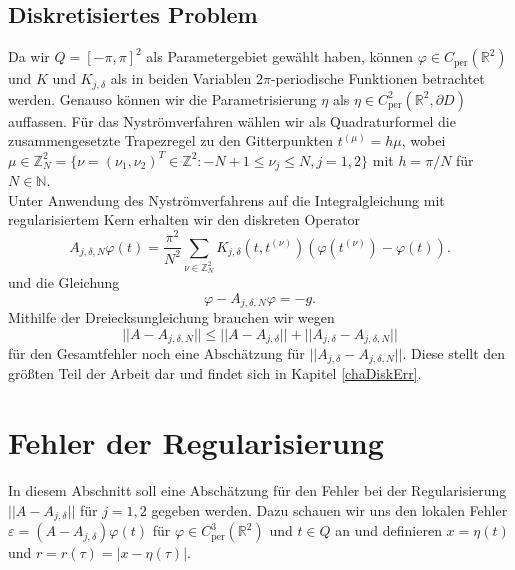 \documentclass[12pt,a4paper]{scrartcl}
\numberwithin{equation}{section}
\newcommand{\R}{\mathbb{R}} %
\newcommand{\Z}{\mathbb{Z}} %
\newcommand{\N}{\mathbb{N}} %
\newcommand{\per}{\operatorname{per}}
\begin{document}
\subsection{Diskretisiertes Problem} \label{DiskProblem}

Da wir $Q=[-\pi,\pi]^2$ als Parametergebiet gewählt haben, können $\varphi\in C_{\mathrm{per}}(\R^2)$ und $K$ und $K_{j,\delta}$ als in beiden Variablen $2 \pi$-periodische Funktionen betrachtet werden. Genauso können wir die Parametrisierung $\eta$ als $\eta \in C_{\per}^2(\R^2,\partial D)$ auffassen. Für das Nyströmverfahren wählen wir als Quadraturformel die zusammengesetzte Trapezregel zu den Gitterpunkten $t^{(\mu)}=h \mu$, wobei $\mu \in \Z_N^2=\{\nu =(\nu_1,\nu_2)^T \in \Z^2 : -N+1 \leq \nu_j \leq N, j= 1,2 \}$ mit $h=\pi/N$ für $N\in \N$.
\\ Unter Anwendung des Nyströmverfahrens auf die Integralgleichung mit regularisiertem Kern erhalten wir den diskreten Operator
\[
A_{j,\delta,N} \varphi(t) = \frac{\pi^2}{N^2}\sum_{\nu\in\Z_N^2}  K_{j,\delta}(t,t^{(\nu)}) \left(\varphi(t^{(\nu)})- \varphi(t)\right).
\] und die Gleichung
\[
\varphi - A_{j,\delta,N} \varphi = -g.
\] Mithilfe der Dreiecksungleichung brauchen wir wegen
\[
||A- A_{j,\delta,N}|| \leq ||A- A_{j,\delta}|| + || A_{j,\delta}-A_{j,\delta,N}||
\] 
für den Gesamtfehler noch eine Abschätzung für   $|| A_{j,\delta}-A_{j,\delta,N}||$. Diese stellt den größten Teil der Arbeit dar und findet sich in Kapitel \ref{chaDiskErr}.
\newpage
\section{Fehler der Regularisierung} \label{chaRegErr} 
In diesem Abschnitt soll eine Abschätzung für den Fehler bei der Regularisierung  \mbox{$||A- A_{j,\delta}||$} für $j=1,2$ gegeben werden. 
Dazu schauen wir uns den lokalen Fehler $\varepsilon = (A- A_{j,\delta})\varphi (t)$  für $\varphi \in C_{\per}^3(\R^2)$ und $t \in Q$ an und definieren $x=\eta(t)$ und $r=r(\tau)=|x-\eta(\tau)|$.
\end{document}
